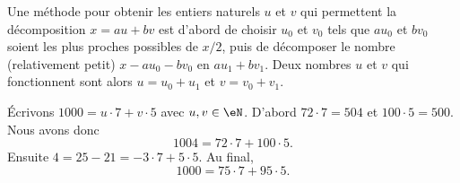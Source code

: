 %
\begin{remark}
    Une méthode pour obtenir les entiers naturels $u$ et $v$ qui permettent la décomposition \(x = au + bv \) est d'abord de choisir $u_0$ et $v_0$ tels que \( au_0 \) et \( bv_0 \) soient les plus proches possibles de $x/2$, puis de décomposer le nombre (relativement petit) \( x - au_0 - bv_0 \) en \( au_1 + bv_1 \). Deux nombres $u$ et $v$ qui fonctionnent sont alors $u = u_0 + u_1$ et $v = v_0 + v_1$.
\end{remark}

\begin{example}
    Écrivons \( 1000=u\cdot 7+v\cdot 5\) avec \( u,v\in \eN\). D'abord \( 72\cdot 7=504\) et \( 100\cdot 5=500\). Nous avons donc 
    \begin{equation}
        1004=72\cdot 7+100\cdot 5.
    \end{equation}
    Ensuite \( 4=25-21=-3\cdot 7+5\cdot 5\). Au final,
    \begin{equation}
        1000=75\cdot 7+95\cdot 5.
    \end{equation}
\end{example}

